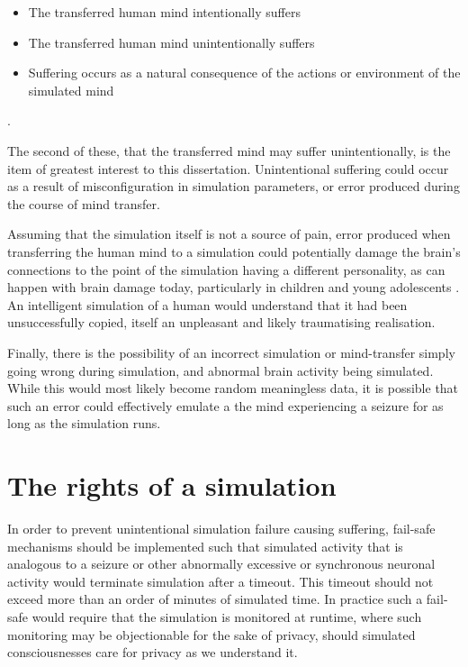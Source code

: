 \begin{itemize}
    \itemsep-0.2em
    \item The transferred human mind intentionally suffers
    \item The transferred human mind unintentionally suffers
    \item Suffering occurs as a natural consequence of the actions or
    environment of the simulated mind
\end{itemize}
\autocite{ziesche_no_2019-1}.

The second of these, that the transferred mind may suffer unintentionally, is
the item of greatest interest to this dissertation. Unintentional suffering
could occur as a result of misconfiguration in simulation parameters, or error
produced during the course of mind transfer. 

Assuming that the simulation itself is not a source of pain, error produced when
transferring the human mind to a simulation could potentially damage the brain's
connections to the point of the simulation having a different personality, as
can happen with brain damage today, particularly in children and young
adolescents \autocite{max_personality_2015}. An intelligent simulation of a
human would understand that it had been unsuccessfully copied, itself an
unpleasant and likely traumatising realisation.

Finally, there is the possibility of an incorrect simulation or mind-transfer
simply going wrong during simulation, and abnormal brain activity being
simulated. While this would most likely become random meaningless data, it is
possible that such an error could effectively emulate a the mind
experiencing a seizure for as long as the simulation runs. 
 
\section{The rights of a simulation}

In order to prevent unintentional simulation failure causing suffering, fail-safe
mechanisms should be implemented such that simulated activity that is analogous
to a seizure or other abnormally excessive or synchronous neuronal activity
would terminate simulation after a timeout. This timeout should not exceed more
than an order of minutes of simulated time. In practice such a fail-safe
would require that the simulation is monitored at runtime, where such monitoring
may be objectionable for the sake of privacy, should simulated consciousnesses
care for privacy as we understand it.

